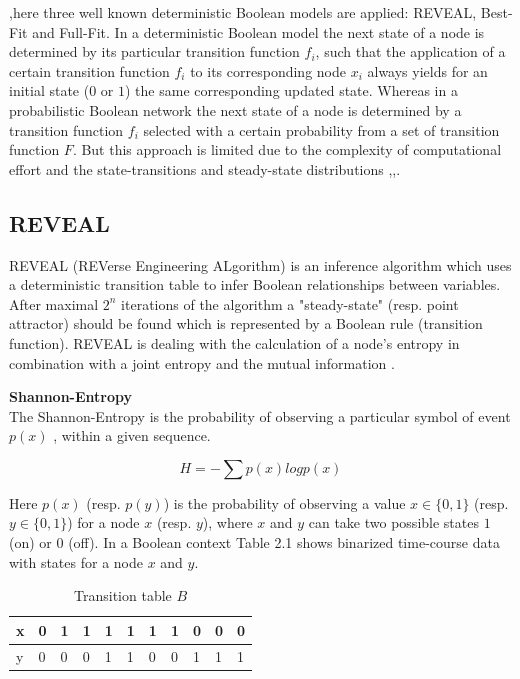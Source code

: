,here three well known deterministic Boolean models are applied: REVEAL, Best-Fit and Full-Fit. In a deterministic Boolean model the next state of a node is determined by its particular transition function $f_{i}$, such that the application of a certain transition function $f_{i}$ to its corresponding node $x_{i}$ always yields for an initial state ($0$ or $1$) the same corresponding updated state. Whereas in a probabilistic Boolean network the next state of a node is determined by a transition function $f_{i}$ selected with a certain probability from a set of transition function $F$. But this approach is limited due to the complexity of computational effort and the state-transitions and steady-state distributions \citep{Liang.1998},\citep{Zhang.2012},\citep{Zoppoli.2010}. %



\subsection*{REVEAL}
REVEAL (REVerse Engineering ALgorithm) is an inference algorithm which uses a deterministic transition table to infer Boolean relationships between variables. After maximal $2^n$ iterations of the algorithm a "steady-state" (\gls{resp.} point attractor) should be found which is represented by a Boolean rule (transition function). REVEAL is dealing with the calculation of a node's entropy in combination with a joint entropy and the mutual information \citep{Liang.1998}.\\
\begin{defn}\textbf{Shannon-Entropy}\\
The Shannon-Entropy is the probability of observing a particular symbol of event $p(x)$ , within a given sequence.
\begin{center}
\begin{equation}
H=-\sum p(x)log p(x)
\end{equation}
\end{center}
\end{defn}


\begin{exmp}
Here $p(x)$ (resp. $p(y)$) is the probability of observing a value $x\in \{0,1\}$ (resp. $y\in \{0,1\}$) for a node $x$ (resp. $y$),  where $x$ and $y$ can take two possible states $1$ (on) or $0$ (off). In a Boolean context Table 2.1 shows binarized time-course data with states for a node $x$ and $y$.\end{exmp}
\begin{table}[H]
\begin{center}
\begin{tabular}{l|llllllllll}
x & 0 & 1 & 1 & 1 & 1 & 1 & 1 & 0 & 0 & 0\\
\hline
y & 0 & 0 & 0 & 1 & 1 & 0 & 0 & 1 & 1 & 1\\
\end{tabular}
\caption{Transition table $B$}
\end{center}
\end{table}


